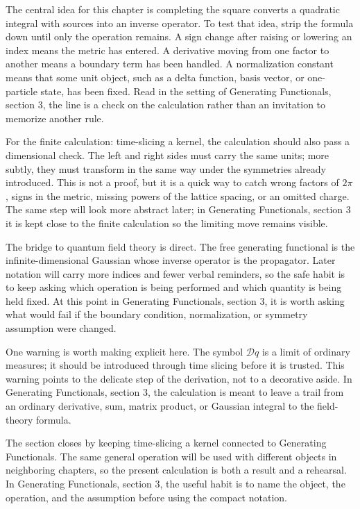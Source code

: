 The central idea for this chapter is completing the square converts a quadratic integral with sources into an inverse operator.  To test that idea, strip the formula down until only the operation remains.  A sign change after raising or lowering an index means the metric has entered.  A derivative moving from one factor to another means a boundary term has been handled.  A normalization constant means that some unit object, such as a delta function, basis vector, or one-particle state, has been fixed.  Read in the setting of Generating Functionals, section 3, the line is a check on the calculation rather than an invitation to memorize another rule.

For the finite calculation: time-slicing a kernel, the calculation should also pass a dimensional check.  The left and right sides must carry the same units; more subtly, they must transform in the same way under the symmetries already introduced.  This is not a proof, but it is a quick way to catch wrong factors of \(2\pi\), signs in the metric, missing powers of the lattice spacing, or an omitted charge.  The same step will look more abstract later; in Generating Functionals, section 3 it is kept close to the finite calculation so the limiting move remains visible.

The bridge to quantum field theory is direct.  The free generating functional is the infinite-dimensional Gaussian whose inverse operator is the propagator.  Later notation will carry more indices and fewer verbal reminders, so the safe habit is to keep asking which operation is being performed and which quantity is being held fixed.  At this point in Generating Functionals, section 3, it is worth asking what would fail if the boundary condition, normalization, or symmetry assumption were changed.

One warning is worth making explicit here.  The symbol \(\mathcal D q\) is a limit of ordinary measures; it should be introduced through time slicing before it is trusted.  This warning points to the delicate step of the derivation, not to a decorative aside.  In Generating Functionals, section 3, the calculation is meant to leave a trail from an ordinary derivative, sum, matrix product, or Gaussian integral to the field-theory formula.

The section closes by keeping time-slicing a kernel connected to Generating Functionals.  The same general operation will be used with different objects in neighboring chapters, so the present calculation is both a result and a rehearsal.  In Generating Functionals, section 3, the useful habit is to name the object, the operation, and the assumption before using the compact notation.



